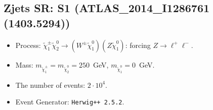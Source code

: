     
\subsection{Zjets SR: S1 (ATLAS\_2014\_I1286761 (1403.5294))} 


        \begin{itemize}
        \item  Process: $\tilde \chi_1^\pm \tilde \chi_2^0 \to (W^\pm \tilde \chi_1^0) (Z \tilde \chi_1^0)$: forcing $Z \to \ell^+ \ell^-$.
        \item  Mass: $m_{\tilde \chi_1^\pm} = m_{\tilde \chi_2^0} = 250$~GeV, $m_{\tilde \chi_1^0} = 0$~GeV.
        \item  The number of events: $2 \cdot 10^4$.
        \item  Event Generator: {\tt Herwig++ 2.5.2}.    
        \end{itemize}    
    
